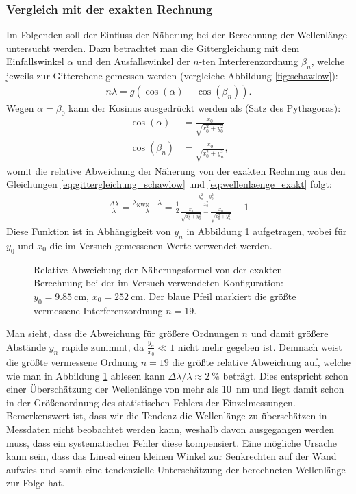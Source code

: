 \documentclass[11pt, a4paper]{article}
\numberwithin{equation}{section}
\begin{document}
\subsubsection{Vergleich mit der exakten Rechnung}
Im Folgenden soll der Einfluss der Näherung bei der Berechnung der Wellenlänge untersucht werden.
Dazu betrachtet man die Gittergleichung mit dem Einfallswinkel $\alpha$ und den Ausfallswinkel der $n$-ten Interferenzordnung $\beta_n$, welche jeweils zur Gitterebene gemessen werden (vergleiche Abbildung \ref{fig:schawlow}):
\begin{align}
	n \lambda = g \left( \cos(\alpha) - \cos(\beta_n) \right) \text{.}
	\label{eq:wellenlaenge_exakt}
\end{align}
Wegen $\alpha = \beta_0$ kann der Kosinus ausgedrückt werden als (Satz des Pythagoras):
\begin{align}
	\cos(\alpha) &= \frac{x_0}{\sqrt{x_0^2 + y_0^2}} \\
	\cos(\beta_n) &= \frac{x_0}{\sqrt{x_0^2 + y_n^2}} \text{,}
\end{align}
womit die relative Abweichung der Näherung von der exakten Rechnung aus den Gleichungen \ref{eq:gittergleichung_schawlow} und \ref{eq:wellenlaenge_exakt} folgt:
\begin{align}
	\frac{\Delta \lambda}{\lambda} = \frac{\lambda_\mathrm{KWN} - \lambda}{\lambda} = \frac{1}{2} \frac{\frac{y_n^2 - y_0^2}{x_0^2}}{ \frac{x_0}{\sqrt{x_0^2 + y_0^2}} - \frac{x_0}{\sqrt{x_0^2 + y_n^2}} } - 1
\end{align}
Diese Funktion ist in Abhängigkeit von $y_n$ in Abbildung \ref{fig:abweichung_wellenlaenge} aufgetragen, wobei für $y_0$ und $x_0$ die im Versuch gemessenen Werte verwendet werden.
\begin{figure}[h]
	\centering
	
	\caption{Relative Abweichung der Näherungsformel von der exakten Berechnung bei der im Versuch verwendeten Konfiguration: $y_0 = \SI{9.85}{\centi\metre}$, $x_0 = \SI{252}{\centi\metre}$. Der blaue Pfeil markiert die größte vermessene Interferenzordnung $n = 19$.}
	\label{fig:abweichung_wellenlaenge}
\end{figure}
Man sieht, dass die Abweichung für größere Ordnungen $n$ und damit größere Abstände $y_n$ rapide zunimmt, da $\frac{y_n}{x_0} \ll 1$ nicht mehr gegeben ist.
Demnach weist die größte vermessene Ordnung $n = \num{19}$ die größte relative Abweichung auf, welche wie man in Abbildung \ref{fig:abweichung_wellenlaenge} ablesen kann $\Delta \lambda / \lambda \approx \SI{2}{\percent}$ beträgt.
Dies entspricht schon einer Überschätzung der Wellenlänge von mehr als \SI{10}{\nano\metre} und liegt damit schon in der Größenordnung des statistischen Fehlers der Einzelmessungen.
Bemerkenswert ist, dass wir die Tendenz die Wellenlänge zu überschätzen in Messdaten nicht beobachtet werden kann, weshalb davon ausgegangen werden muss, dass ein systematischer Fehler diese kompensiert.
Eine mögliche Ursache kann sein, dass das Lineal einen kleinen Winkel zur Senkrechten auf der Wand aufwies und somit eine tendenzielle Unterschätzung der berechneten Wellenlänge zur Folge hat.
\end{document}
